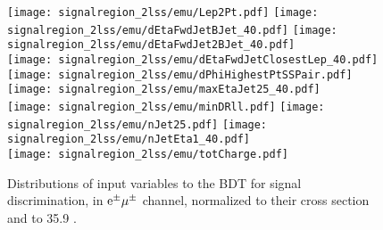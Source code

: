 \begin{figure} [!h]
  \centering
  \texttt{[image: signalregion\_2lss/emu/Lep2Pt.pdf]}
  \texttt{[image: signalregion\_2lss/emu/dEtaFwdJetBJet\_40.pdf]}
  \texttt{[image: signalregion\_2lss/emu/dEtaFwdJet2BJet\_40.pdf]}\\
  \texttt{[image: signalregion\_2lss/emu/dEtaFwdJetClosestLep\_40.pdf]} 
  \texttt{[image: signalregion\_2lss/emu/dPhiHighestPtSSPair.pdf]}
  \texttt{[image: signalregion\_2lss/emu/maxEtaJet25\_40.pdf]}\\
  \texttt{[image: signalregion\_2lss/emu/minDRll.pdf]}
  \texttt{[image: signalregion\_2lss/emu/nJet25.pdf]} 
  \texttt{[image: signalregion\_2lss/emu/nJetEta1\_40.pdf]}\\
  \texttt{[image: signalregion\_2lss/emu/totCharge.pdf]}
  \caption[Input variables to the BDT, $2lss-\emu$ channel]{Distributions of input variables to the BDT for signal discrimination, in $\textrm{e}^\pm\mu^\pm$ channel, normalized to their cross section and to 35.9 \fbinv.}
  \label{fig:input_vars_2lss_xsec_emu}
\end{figure}


